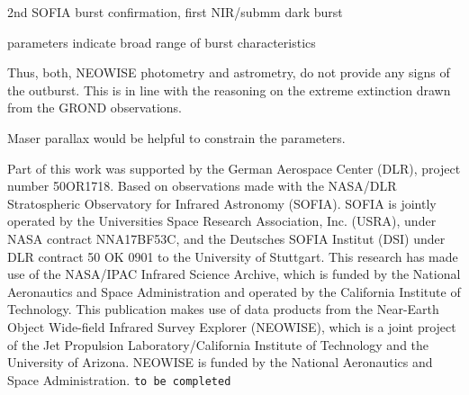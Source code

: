 \documentclass[longauth,usenatbib]{aa}
\begin{document}
2nd SOFIA burst confirmation, first NIR/submm dark burst

parameters indicate broad range of burst characteristics

Thus, both, NEOWISE photometry and astrometry, do not provide any signs of the outburst. This is in line with the reasoning on the extreme extinction drawn from the GROND observations. 

Maser parallax would be helpful to constrain the parameters.

\begin{acknowledgements}
      Part of this work was supported by the German Aerospace Center (DLR), project
      number 50OR1718.
      Based on observations made with the NASA/DLR Stratospheric Observatory for Infrared Astronomy (SOFIA). SOFIA is jointly operated by the Universities Space Research Association, Inc. (USRA), under NASA contract NNA17BF53C, and the Deutsches SOFIA Institut (DSI) under DLR contract 50 OK 0901 to the University of Stuttgart.
      This research has made use of the NASA/IPAC Infrared Science Archive, which is funded by the National Aeronautics and Space Administration and operated by the California Institute of Technology.
      This publication makes use of data products from the Near-Earth Object Wide-field Infrared Survey Explorer (NEOWISE), which is a joint project of the Jet Propulsion Laboratory/California Institute of Technology and the University of Arizona. NEOWISE is funded by the National Aeronautics and Space Administration.
      {\tt to be completed}
\end{acknowledgements}


\end{document}
